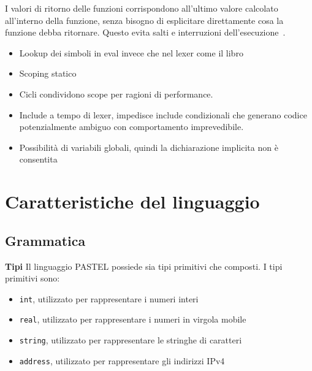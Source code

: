 \documentclass[10pt]{article}
\begin{document}
I valori di ritorno delle funzioni corrispondono all'ultimo valore calcolato all'interno della funzione, senza bisogno di esplicitare direttamente cosa la funzione debba ritornare. Questo evita salti e interruzioni dell'esecuzione~\cite{dijkstra1968letters}.

\begin{itemize}
	\item Lookup dei simboli in eval invece che nel lexer come il libro~\cite{levine2009flex}
	\item Scoping statico
	\item Cicli condividono scope per ragioni di performance.
	\item Include a tempo di lexer, impedisce include condizionali che generano codice potenzialmente ambiguo con comportamento imprevedibile.
	\item Possibilità di variabili globali, quindi la dichiarazione implicita non è consentita
\end{itemize}




\section{Caratteristiche del linguaggio}\label{section:caratteristiche-linguaggio}

\subsection{Grammatica}

\textbf{Tipi}
Il linguaggio PASTEL possiede sia tipi primitivi che composti. I tipi primitivi sono:
\begin{itemize}
\item \texttt{int}, utilizzato per rappresentare i numeri interi
\item \texttt{real}, utilizzato per rappresentare i numeri in virgola mobile
\item \texttt{string}, utilizzato per rappresentare le stringhe di caratteri
\item \texttt{address}, utilizzato per rappresentare gli indirizzi IPv4
\end{itemize}
\end{document}
